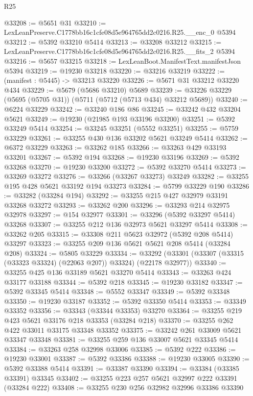 \begin{lexlean}{R25}
\begin{coremodule}
@33208 := @5651 @31
@33210 := LexLeanPreserve.C1778bb16c1cfe08d5e964765dd2c0216.R25.__enc_0 @5394
@33212 := @5392 @33210 @5414
@33213 := @33208 @33212
@33215 := LexLeanPreserve.C1778bb16c1cfe08d5e964765dd2c0216.R25.__fits_2 @5394
@33216 := @5657 @33215
@33218 := LexLeanBoot.ManifestText.manifestJson @5394
@33219 := @19230 @33218
@33220 := @33216 @33219
@33222 := (manifest : @5445) -> @33213 @33220
@33226 := @5671 @31 @33212 @33220 @434
@33229 := @5679 (@5686 @33210) @5689
@33239 := @33226 @33229 (@5695 (@5705 @31)) (@5711 (@5712 (@5713 @434) @33212 @5689))
@33240 := @6224 @33229
@33242 := @33240 @186 @86
@33245 := @33242 @432 @33204 @5621
@33249 := @19230 (@21985 @193 @33196 @33200)
@33251 := @5392 @33249 @5414
@33254 := @33245 @33251 (@5552 @33251)
@33255 := @5759 @33229
@33261 := @33255 @430 @136 @33202 @5621 @33249 @5414
@33262 := @6372 @33229
@33263 := @33262 @185
@33266 := @33263 @429 @33193 @33201
@33267 := @5392 @194
@33268 := @19230 @33196
@33269 := @5392 @33268
@33270 := @19230 @33200
@33272 := @5392 @33270 @5414
@33273 := @33269 @33272
@33276 := @33266 (@33267 @33273) @33249
@33282 := @33255 @195 @428 @5621 @33192 @194 @33273
@33284 := @5799 @33229 @190
@33286 := @33282 (@33284 @194)
@33292 := @33255 @215 @427 @32979 @33191 @33268 @33272
@33293 := @33262 @200
@33296 := @33293 @214 @32975 @32978
@33297 := @154 @32977
@33301 := @33296 (@5392 @33297 @5414) @33268
@33307 := @33255 @212 @136 @32973 @5621 @33297 @5414
@33308 := @33262 @205
@33315 := @33308 @211 @5623 @32972 (@5392 @208 @5414) @33297
@33323 := @33255 @209 @136 @5621 @5621 @208 @5414 (@33284 @208)
@33324 := @5805 @33229
@33334 := @33292 (@33301 (@33307 (@33315 (@33323 @33324) (@22063 @207)) @33324) (@22178 @32977))
@33340 := @33255 @425 @136 @33189 @5621 @33270 @5414
@33343 := @33263 @424 @33177 @33188
@33344 := @5392 @218
@33345 := @19230 @33182
@33347 := @5392 @33345 @5414
@33348 := @5552 @33347
@33349 := @5392 @33348
@33350 := @19230 @33187
@33352 := @5392 @33350 @5414
@33353 := @33349 @33352
@33356 := @33343 (@33344 @33353) @33270
@33364 := @33255 @219 @423 @5621 @33176 @218 @33353 (@33284 @218)
@33370 := @33255 @262 @422 @33011 @33175 @33348 @33352
@33375 := @33242 @261 @33009 @5621 @33347 @33348
@33381 := @33255 @259 @136 @33007 @5621 @33345 @5414
@33384 := @33263 @258 @32998 @33006
@33385 := @5392 @222
@33386 := @19230 @33001
@33387 := @5392 @33386
@33388 := @19230 @33005
@33390 := @5392 @33388 @5414
@33391 := @33387 @33390
@33394 := @33384 (@33385 @33391) @33345
@33402 := @33255 @223 @257 @5621 @32997 @222 @33391 (@33284 @222)
@33408 := @33255 @230 @256 @32982 @32996 @33386 @33390

\end{coremodule}
\end{lexlean}
